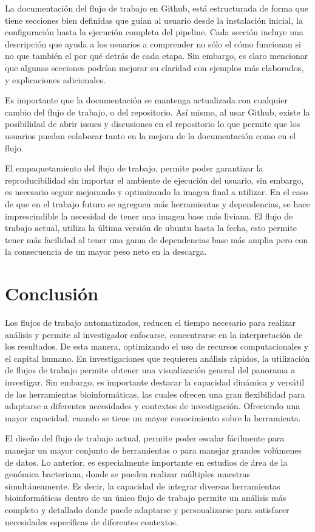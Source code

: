 \documentclass[12pt]{article}
\begin{document}
La documentación del flujo de trabajo en Github, está estructurada de forma 
que tiene secciones bien definidas que guían al usuario desde la instalación 
inicial, la configuración hasta la ejecución completa del pipeline. Cada 
sección incluye una descripción que ayuda a los usuarios a comprender no sólo 
el cómo funcionan si no que también el por qué detrás de cada etapa. Sin embargo, 
es claro mencionar que algunas secciones podrían mejorar su claridad con ejemplos 
más elaborados, y explicaciones adicionales.
	
Es importante que la documentación se mantenga actualizada con cualquier cambio 
del flujo de trabajo, o del repositorio. Así mismo, al usar Github, existe la 
posibilidad de abrir issues y discusiones en el repositorio lo que permite que 
los usuarios puedan colaborar tanto en la mejora de la documentación como en el flujo.

El empaquetamiento del flujo de trabajo, permite poder garantizar la 
reproducibilidad sin importar el ambiente de ejecución del usuario, sin embargo, 
es necesario seguir mejorando y optimizando la imagen final a utilizar. En el caso 
de que en el trabajo futuro se agreguen más herramientas y dependencias, se hace 
imprescindible la necesidad de tener una imagen base más liviana. El flujo de trabajo 
actual, utiliza la última versión de ubuntu hasta la fecha, esto permite tener más 
facilidad al tener una gama de dependencias base más amplia pero con la consecuencia 
de un mayor peso neto en la descarga. 


\newpage
\section{Conclusión}
Los flujos de trabajo automatizados, reducen el tiempo necesario 
para realizar análisis y permite al investigador enfocarse, 
concentrarse en la interpretación de los resultados. De esta manera, 
optimizando el uso de recursos computacionales y el capital humano. 
En investigaciones que requieren análisis rápidos, la utilización de 
flujos de trabajo permite obtener una visualización general del 
panorama a investigar. Sin embargo, es importante destacar la 
capacidad dinámica y versátil de las herramientas bioinformáticas, 
las cuales ofrecen una gran flexibilidad para adaptarse a diferentes 
necesidades y contextos de investigación. Ofreciendo una mayor 
capacidad, cuando se tiene un mayor conocimiento sobre la herramienta.


El diseño del flujo de trabajo actual, permite poder escalar 
fácilmente para manejar un mayor conjunto de herramientas o para 
manejar grandes volúmenes de datos. Lo anterior, es especialmente 
importante en estudios de área de la genómica bacteriana, donde se 
pueden realizar múltiples muestras simultáneamente. Es decir, la 
capacidad de integrar diversas herramientas bioinformáticas dentro 
de un único flujo de trabajo permite un análisis más completo y 
detallado donde puede adaptarse y personalizarse para satisfacer 
necesidades específicas de diferentes contextos. 
\end{document}
